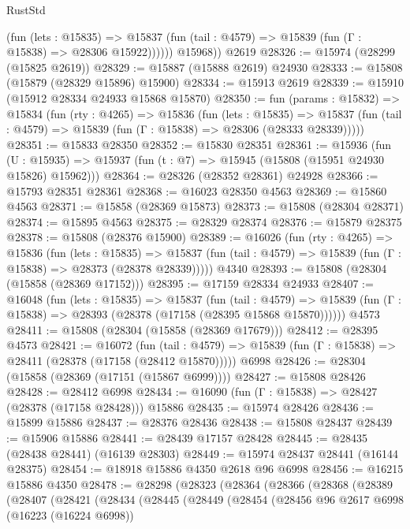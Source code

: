 \begin{lexlean}{RustStd}
\begin{coremodule}
              (fun (lets : @15835) =>
              @15837 (fun (tail : @4579) => @15839 (fun (Γ : @15838) => @28306 @15922))))))
        @15968))
    @2619
@28326 := @15974 (@28299 (@15825 @2619))
@28329 := @15887 (@15888 @2619) @24930
@28333 := @15808 (@15879 (@28329 @15896) @15900)
@28334 := @15913 @2619
@28339 := @15910 (@15912 @28334 @24933 @15868 @15870)
@28350 := fun (params : @15832) =>
  @15834
    (fun (rty : @4265) =>
    @15836
      (fun (lets : @15835) =>
      @15837 (fun (tail : @4579) => @15839 (fun (Γ : @15838) => @28306 (@28333 @28339)))))
@28351 := @15833 @28350
@28352 := @15830 @28351
@28361 := @15936
    (fun (U : @15935) => @15937 (fun (t : @7) => @15945 (@15808 (@15951 @24930 @15826) @15962)))
@28364 := @28326 (@28352 @28361) @24928
@28366 := @15793 @28351 @28361
@28368 := @16023 @28350 @4563
@28369 := @15860 @4563
@28371 := @15858 (@28369 @15873)
@28373 := @15808 (@28304 @28371)
@28374 := @15895 @4563
@28375 := @28329 @28374
@28376 := @15879 @28375
@28378 := @15808 (@28376 @15900)
@28389 := @16026
    (fun (rty : @4265) =>
    @15836
      (fun (lets : @15835) =>
      @15837 (fun (tail : @4579) => @15839 (fun (Γ : @15838) => @28373 (@28378 @28339)))))
    @4340
@28393 := @15808 (@28304 (@15858 (@28369 @17152)))
@28395 := @17159 @28334 @24933
@28407 := @16048
    (fun (lets : @15835) =>
    @15837
      (fun (tail : @4579) =>
      @15839 (fun (Γ : @15838) => @28393 (@28378 (@17158 (@28395 @15868 @15870))))))
    @4573
@28411 := @15808 (@28304 (@15858 (@28369 @17679)))
@28412 := @28395 @4573
@28421 := @16072
    (fun (tail : @4579) => @15839 (fun (Γ : @15838) => @28411 (@28378 (@17158 (@28412 @15870)))))
    @6998
@28426 := @28304 (@15858 (@28369 (@17151 (@15867 @6999))))
@28427 := @15808 @28426
@28428 := @28412 @6998
@28434 := @16090 (fun (Γ : @15838) => @28427 (@28378 (@17158 @28428))) @15886
@28435 := @15974 @28426
@28436 := @15899 @15886
@28437 := @28376 @28436
@28438 := @15808 @28437
@28439 := @15906 @15886
@28441 := @28439 @17157 @28428
@28445 := @28435 (@28438 @28441) (@16139 @28303)
@28449 := @15974 @28437 @28441 (@16144 @28375)
@28454 := @18918 @15886 @4350 @2618 @96 @6998
@28456 := @16215 @15886 @4350
@28478 := @28298
    (@28323
      (@28364
        (@28366
          (@28368
            (@28389
              (@28407
                (@28421
                  (@28434
                    (@28445
                      (@28449
                        (@28454
                          (@28456
                            @96
                            @2617
                            @6998
                            (@16223 (@16224 @6998))

\end{coremodule}
\end{lexlean}
